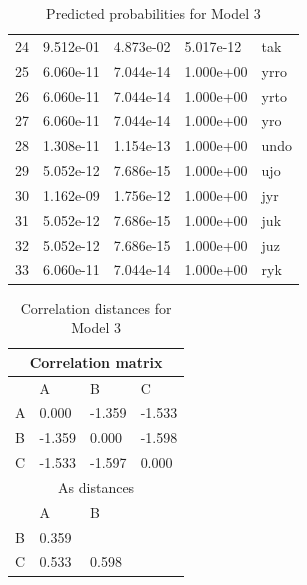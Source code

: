 \begin{table}[!htpb]
\begin{tabular}{lllll}
    24 & 9.512e-01     & 4.873e-02     & 5.017e-12     & tak  \\
    25 & 6.060e-11     & 7.044e-14     & 1.000e+00     & yrro \\
    26 & 6.060e-11     & 7.044e-14     & 1.000e+00     & yrto \\
    27 & 6.060e-11     & 7.044e-14     & 1.000e+00     & yro  \\
    28 & 1.308e-11     & 1.154e-13     & 1.000e+00     & undo \\
    29 & 5.052e-12     & 7.686e-15     & 1.000e+00     & ujo  \\
    30 & 1.162e-09     & 1.756e-12     & 1.000e+00     & jyr  \\
    31 & 5.052e-12     & 7.686e-15     & 1.000e+00     & juk  \\
    32 & 5.052e-12     & 7.686e-15     & 1.000e+00     & juz  \\
    33 & 6.060e-11     & 7.044e-14     & 1.000e+00     & ryk  \\
    \bottomrule
  \end{tabular}
  \caption{Predicted probabilities for Model 3}\label{tab:probabilities-model3}
\end{table}

\begin{table}[!htpb]
  \centering
  \begin{tabular}{llll}
    \toprule
    \multicolumn{4}{c}{Correlation matrix} \\
    \midrule
      & A      & B      & C                \\
    \midrule
    A & 0.000  & -1.359 & -1.533           \\
    B & -1.359 & 0.000  & -1.598           \\
    C & -1.533 & -1.597 & 0.000            \\
    \midrule
    \multicolumn{4}{c}{As distances}       \\
      & A      & B                         \\
    \midrule
    B & 0.359  &                           \\
    C & 0.533  & 0.598                     \\
    \bottomrule
  \end{tabular}
  \caption{Correlation distances for Model 3}\label{tab:corr-dist-model3}
\end{table}

